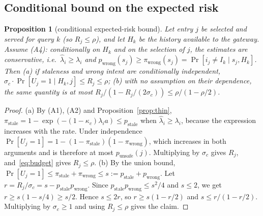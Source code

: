 \documentclass[journal]{IEEEtran}
\newtheorem{proposition}{Proposition}
\newcommand{\hatlam}{\hat{\lambda}}
\begin{document}
\subsection{Conditional bound on the expected risk}\label{sec:bound}
\begin{proposition}[conditional expected-risk bound]\label{prop:bound}
Let entry $j$ be selected and served for query $k$ (so $R_j\le\rho$), and let $H_k$ be the history available to the gateway. Assume (A4): conditionally on $H_k$ and on the selection of $j$, the estimates are conservative, i.e.\ $\hatlam_i\ge\lambda_i$ and $p_{\text{wrong}}(s_j)\ge\pi_{\text{wrong}}(s_j)=\Pr[i_j\neq I_k\mid s_j,H_k]$. Then (a) if staleness and wrong intent are conditionally independent, $\sigma_c\cdot\Pr[U_j=1\mid H_k,j]\le R_j\le\rho$; (b) with no assumption on their dependence, the same quantity is at most $R_j/(1-R_j/(2\sigma_c))\le\rho/(1-\rho/2)$.
\end{proposition}
\begin{proof}
(a) By (A1), (A2) and Proposition~\ref{prop:thin}, $\pi_{\text{stale}}=1-\exp(-(1-\kappa_c)\lambda_i a)\le p_{\text{stale}}$ when $\hatlam_i\ge\lambda_i$, because the expression increases with the rate. Under independence $\Pr[U_j=1]=1-(1-\pi_{\text{stale}})(1-\pi_{\text{wrong}})$, which increases in both arguments and is therefore at most $p_{\text{unsafe}}(j)$. Multiplying by $\sigma_c$ gives $R_j$, and~\eqref{eq:budget} gives $R_j\le\rho$. (b) By the union bound, $\Pr[U_j=1]\le\pi_{\text{stale}}+\pi_{\text{wrong}}\le s:=p_{\text{stale}}+p_{\text{wrong}}$. Let $r=R_j/\sigma_c=s-p_{\text{stale}}p_{\text{wrong}}$. Since $p_{\text{stale}}p_{\text{wrong}}\le s^2/4$ and $s\le 2$, we get $r\ge s(1-s/4)\ge s/2$. Hence $s\le 2r$, so $r\ge s(1-r/2)$ and $s\le r/(1-r/2)$. Multiplying by $\sigma_c\ge 1$ and using $R_j\le\rho$ gives the claim.
\end{proof}
\end{document}

